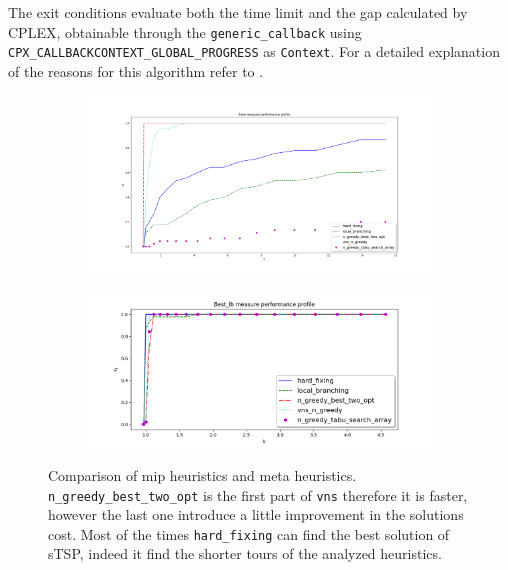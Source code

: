 The exit conditions evaluate both the time limit and the gap calculated by CPLEX, obtainable through the \texttt{generic\_callback} using \texttt{CPX\_CALLBACKCONTEXT\_GLOBAL\_PROGRESS} as \texttt{Context}. 
For a detailed explanation of the reasons for this algorithm refer to \cite{article}.


\begin{figure}[h]
	\centering
	\begin{subfigure}{\columnwidth}
		\includegraphics[width=\columnwidth]{../res/Lmip_meta_LA_time.png}
		\caption{}
		\label{fig:Lmip_meta_LA_time}
	\end{subfigure}
	\begin{subfigure}{\columnwidth}
		\includegraphics[width=\columnwidth]{../res/Lmip_meta_LA_lb.png}
		\caption{}
		\label{fig:Lmip_meta_LA_lb}
	\end{subfigure}
\caption{Comparison of mip heuristics and meta heuristics. \texttt{n\_greedy\_best\_two\_opt} is the first part of \texttt{vns} therefore it is faster, however the last one introduce a little improvement in the solutions cost. Most of the times \texttt{hard\_fixing} can find the best solution of sTSP, indeed it find the shorter tours of the analyzed heuristics. }
\label{fig:Lmip_meta_LA}
\end{figure}


